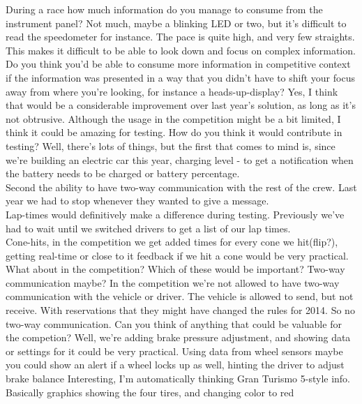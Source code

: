 \begin{dialogue}
     During a race how much information do you manage to consume from the instrument panel? 
     Not much, maybe a blinking LED or two, but it's difficult to read the speedometer for instance. 
    	The pace is quite high, and very few straights. This makes it difficult to be able to look down
    	and focus on complex information. 
     Do you think you'd be able to consume more information in competitive context if the information was 
    	presented in a way that you didn't have to shift your focus away from where you're looking, for instance a heads-up-display?
     Yes, I think that would be a considerable improvement over last year's solution, as long as it's not obtrusive.
    	Although the usage in the competition might be a bit limited, I think it could be amazing for testing.
     How do you think it would contribute in testing?
     Well, there's lots of things, but the first that comes to mind is, since we're building an electric car this year,
    	charging level - to get a notification when the battery needs to be charged or battery percentage.\\
    	Second the ability to have two-way communication with the rest of the crew. Last year we had to stop whenever they wanted to
    	give a message.\\
    	Lap-times would definitively make a difference during testing. Previously we've had to wait until we switched drivers to get a list of our lap times.\\
    	Cone-hits, in the competition we get added times for every cone we hit(flip?), getting real-time or close to it feedback if we hit a cone would be very practical.
     What about in the competition? Which of these would be important? Two-way communication maybe?
     In the competition we're not allowed to have two-way communication with the vehicle or driver. The vehicle is allowed to send, but not receive.
    	With reservations that they might have changed the rules for 2014.
     So no two-way communication. Can you think of anything that could be valuable for the competion?
     Well, we're adding brake pressure adjustment, and showing data or settings for it could be very practical. Using data from wheel sensors
    	maybe you could show an alert if a wheel locks up as well, hinting the driver to adjust brake balance
     Interesting, I'm automatically thinking Gran Turismo 5-style info. Basically graphics showing the four tires, and changing color to red

\end{dialogue}

